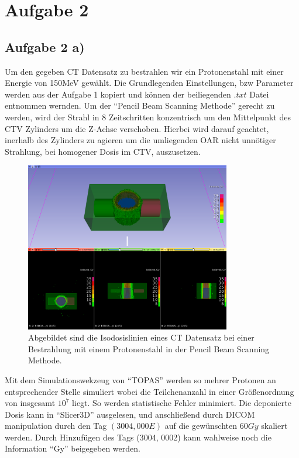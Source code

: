 \section{Aufgabe 2}
\subsection{Aufgabe 2 a)}
Um den gegeben CT Datensatz zu bestrahlen wir ein Protonenstahl mit einer Energie von 150\si{MeV} gewählt.
Die Grundlegenden Einstellungen, bzw Parameter werden aus der Aufgabe 1 kopiert und können der beiliegenden $.txt$ Datei entnommen wernden.
Um der \enquote{Pencil Beam Scanning Methode} gerecht zu werden, wird der Strahl in 8 Zeitschritten
konzentrisch um den Mittelpunkt des CTV Zylinders um die Z-Achse verschoben. 
Hierbei wird darauf geachtet, inerhalb des Zylinders zu agieren um die umliegenden OAR nicht unnötiger Strahlung, bei homogener Dosis im CTV, auszusetzen. 
\begin{figure}
    \centering
    \includegraphics[width= 0.8\textwidth]{content/iso.png}
    \caption{Abgebildet sind die Isodosislinien eines CT Datensatz bei einer Bestrahlung mit einem Protonenstahl in der Pencil Beam Scanning
    Methode.}
    \label{fig:iso}
\end{figure}
Mit dem Simulationswekzeug von \enquote{TOPAS} werden so mehrer Protonen an entsprechender Stelle simuliert wobei die Teilchenanzahl in einer Größenordnung 
von insgesamt $10^7$ liegt. So werden statistische Fehler minimiert. Die deponierte Dosis kann in \enquote{Slicer3D} ausgelesen,
und anschließend durch DICOM manipulation durch den Tag $(3004, 000E)$ auf die gewünschten $60 Gy$ skaliert werden. 
Durch Hinzufügen des Tags (3004, 0002) kann wahlweise noch die Information \enquote{Gy} beigegeben werden.

